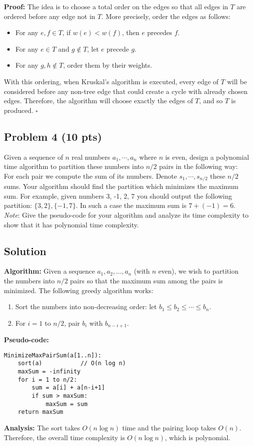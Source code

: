 \documentclass[12pt]{article}
\begin{document}
\textbf{Proof:}  
The idea is to choose a total order on the edges so that all edges in \(T\) are ordered before any edge not in \(T\). More precisely, order the edges as follows:
\begin{itemize}
    \item For any \(e,f\in T\), if \(w(e) < w(f)\), then \(e\) precedes \(f\).
    \item For any \(e\in T\) and \(g\notin T\), let \(e\) precede \(g\).
    \item For any \(g,h\notin T\), order them by their weights.
\end{itemize}
With this ordering, when Kruskal's algorithm is executed, every edge of \(T\) will be considered before any non-tree edge that could create a cycle with already chosen edges. Therefore, the algorithm will choose exactly the edges of \(T\), and so \(T\) is produced. \(\square\)

\bigskip

\subsection*{Problem 4 (10 pts)}
Given a sequence of $n$ real numbers $a_1 , \cdots, a_n$ where $n$ is even, design a polynomial time algorithm to partition these numbers into $n/2$ pairs in the following way: For each pair we compute the sum of its numbers. Denote $s_1, \cdots, s_{n/2}$ these $n/2$ sums. Your algorithm should find the partition which minimizes the maximum sum. For example, given numbers 3, -1, 2, 7 you should output the following partition: $\{3, 2\}, \{-1, 7\}$. In such a case the maximum sum is $7 + (-1) = 6$.\\
\textit{Note}: Give the pseudo-code for your algorithm and analyze its time complexity to show that it has polynomial time complexity.

\subsection*{Solution}
\textbf{Algorithm:}  
Given a sequence \(a_1,a_2,\dots,a_n\) (with \(n\) even), we wish to partition the numbers into \(n/2\) pairs so that the maximum sum among the pairs is minimized. The following greedy algorithm works:
\begin{enumerate}
    \item Sort the numbers into non-decreasing order: let \(b_1 \le b_2 \le \cdots \le b_n\).
    \item For \(i=1\) to \(n/2\), pair \(b_i\) with \(b_{n-i+1}\).
\end{enumerate}
\textbf{Pseudo-code:}
\begin{verbatim}
MinimizeMaxPairSum(a[1..n]):
    sort(a)           // O(n log n)
    maxSum = -infinity
    for i = 1 to n/2:
        sum = a[i] + a[n-i+1]
        if sum > maxSum:
            maxSum = sum
    return maxSum
\end{verbatim}
\textbf{Analysis:}  
The sort takes \(O(n\log n)\) time and the pairing loop takes \(O(n)\). Therefore, the overall time complexity is \(O(n\log n)\), which is polynomial.
\end{document}
